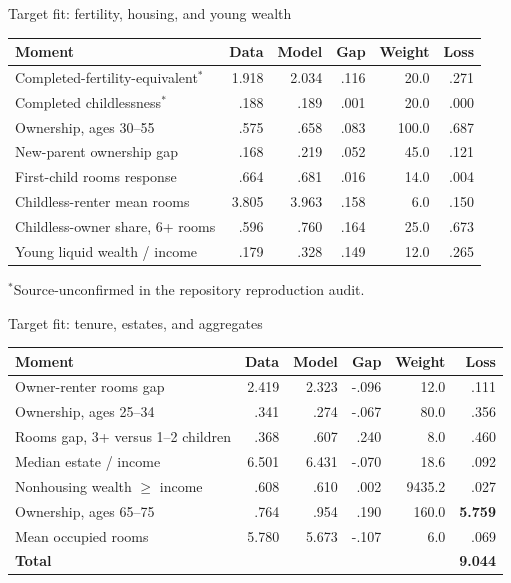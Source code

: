 \documentclass[aspectratio=169,11pt]{beamer}
\begin{document}
\begin{frame}{Target fit: fertility, housing, and young wealth}
\tiny
\centering
\begin{tabularx}{\textwidth}{Yrrrrr}
\toprule
Moment & Data & Model & Gap & Weight & Loss\\
\midrule
Completed-fertility-equivalent$^{*}$ & 1.918 & 2.034 & .116 & 20.0 & .271\\
Completed childlessness$^{*}$ & .188 & .189 & .001 & 20.0 & .000\\
Ownership, ages 30--55 & .575 & .658 & .083 & 100.0 & .687\\
New-parent ownership gap & .168 & .219 & .052 & 45.0 & .121\\
First-child rooms response & .664 & .681 & .016 & 14.0 & .004\\
Childless-renter mean rooms & 3.805 & 3.963 & .158 & 6.0 & .150\\
Childless-owner share, 6+ rooms & .596 & .760 & .164 & 25.0 & .673\\
Young liquid wealth / income & .179 & .328 & .149 & 12.0 & .265\\
\bottomrule
\end{tabularx}

\vspace{0.6em}
\raggedright $^{*}$Source-unconfirmed in the repository reproduction audit.
\end{frame}

\begin{frame}{Target fit: tenure, estates, and aggregates}
\tiny
\centering
\begin{tabularx}{\textwidth}{Yrrrrr}
\toprule
Moment & Data & Model & Gap & Weight & Loss\\
\midrule
Owner-renter rooms gap & 2.419 & 2.323 & -.096 & 12.0 & .111\\
Ownership, ages 25--34 & .341 & .274 & -.067 & 80.0 & .356\\
Rooms gap, 3+ versus 1--2 children & .368 & .607 & .240 & 8.0 & .460\\
Median estate / income & 6.501 & 6.431 & -.070 & 18.6 & .092\\
Nonhousing wealth $\geq$ income & .608 & .610 & .002 & 9435.2 & .027\\
 Ownership, ages 65--75 & .764 & .954 & .190 & 160.0 & \textbf{5.759}\\
Mean occupied rooms & 5.780 & 5.673 & -.107 & 6.0 & .069\\
\midrule
\textbf{Total} &&&&& \textbf{9.044}\\
\bottomrule
\end{tabularx}
\end{frame}
\end{document}
